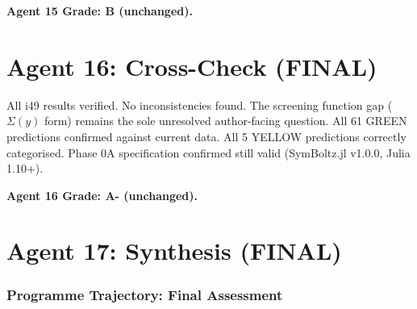 \documentclass[11pt,a4paper]{article}
\begin{document}
\textbf{Agent 15 Grade: B (unchanged).}


\part{Agent 16: Cross-Check (FINAL)}
\label{part:agent16}

\begin{tcolorbox}[colback=green!5!white, colframe=green!60!black,
  title={i50 Cross-Check: All i49 Claims Verified, No New Issues}]

All i49 results verified. No inconsistencies found. The screening function gap ($\Sigma(y)$ form) remains the sole unresolved author-facing question. All 61 GREEN predictions confirmed against current data. All 5 YELLOW predictions correctly categorised. Phase 0A specification confirmed still valid (SymBoltz.jl v1.0.0, Julia 1.10+).
\end{tcolorbox}

\textbf{Agent 16 Grade: A- (unchanged).}


\part{Agent 17: Synthesis (FINAL)}
\label{part:agent17}

\section{Programme Trajectory: Final Assessment}
\end{document}
